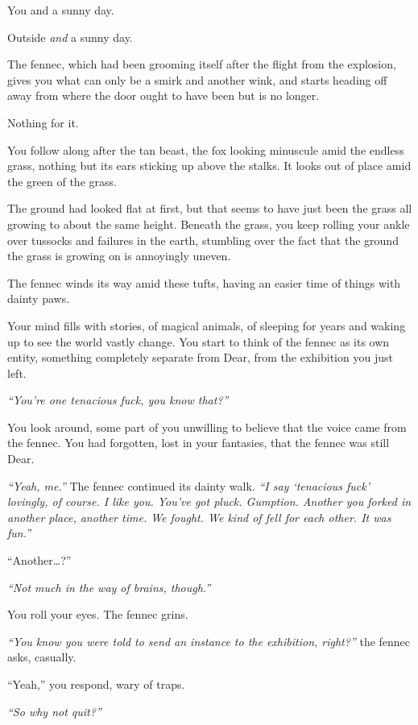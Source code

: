 \newpage

You and a sunny day.

Outside \emph{and} a sunny day.

The fennec, which had been grooming itself after the flight from the explosion, gives you what can only be a smirk and another wink, and starts heading off away from where the door ought to have been but is no longer.

Nothing for it.

You follow along after the tan beast, the fox looking minuscule amid the endless grass, nothing but its ears sticking up above the stalks. It looks out of place amid the green of the grass.

The ground had looked flat at first, but that seems to have just been the grass all growing to about the same height. Beneath the grass, you keep rolling your ankle over tussocks and failures in the earth, stumbling over the fact that the ground the grass is growing on is annoyingly uneven.

The fennec winds its way amid these tufts, having an easier time of things with dainty paws.

Your mind fills with stories, of magical animals, of sleeping for years and waking up to see the world vastly change. You start to think of the fennec as its own entity, something completely separate from Dear, from the exhibition you just left.

\emph{``You're one tenacious fuck, you know that?''}

You look around, some part of you unwilling to believe that the voice came from the fennec. You had forgotten, lost in your fantasies, that the fennec was still Dear.

\emph{``Yeah, me.''} The fennec continued its dainty walk. \emph{``I say `tenacious fuck' lovingly, of course. I like you. You've got pluck. Gumption. Another you forked in another place, another time. We fought. We kind of fell for each other. It was fun.''}

``Another\ldots{}?''

\emph{``Not much in the way of brains, though.''}

You roll your eyes. The fennec grins.

\emph{``You know you were told to send an instance to the exhibition, right?''} the fennec asks, casually.

``Yeah,'' you respond, wary of traps.

\emph{``So why not quit?''}

